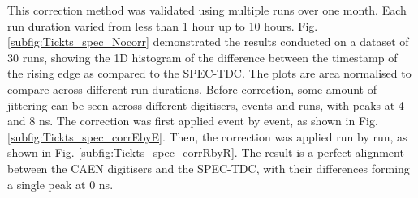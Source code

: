 
This correction method was validated using multiple runs over one month.
Each run duration varied from less than 1 hour up to 10 hours.
Fig. \ref{subfig:Tickts_spec_Nocorr} demonstrated the results conducted on a dataset of 30 runs, showing the 1D histogram of the difference between the timestamp of the rising edge as compared to the
 SPEC-TDC.
The plots are area normalised to compare across different run durations.
Before correction, some amount of jittering can be seen across different digitisers, events and runs, with peaks at 4 and 8 ns.
The correction was first applied event by event, as shown in Fig. \ref{subfig:Tickts_spec_corrEbyE}.
Then, the correction was applied run by run, as shown in Fig. \ref{subfig:Tickts_spec_corrRbyR}.
The result is a perfect alignment between the CAEN digitisers and the SPEC-TDC, with their differences forming a single peak at 0 ns.

